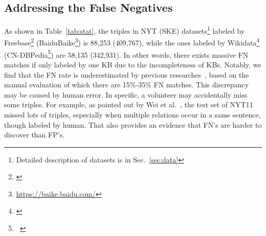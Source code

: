 \documentclass[11pt,a4paper]{article}
\begin{document}
\subsection{Addressing the False Negatives}
\label{sec:fn}
As shown in Table~\ref{tab:stat}, the triples in NYT (SKE) datasets\footnote{Detailed description of datasets is in Sec.~\ref{sec:data}} labeled by Freebase\footnote{\cite{bollacker2008freebase}}
(BaiduBaike\footnote{\url{https://baike.baidu.com/}}) is 88,253 (409,767), 
while the ones labeled by Wikidata\footnote{\cite{Vrandecic2014WikidataAF}} (CN-DBPedia\footnote{~\cite{Xu2017CNDBpediaAN}}) are 58,135 (342,931). 
In other words, there exists massive FN matches if only labeled by one KB due to the incompleteness of KBs. 
Notably, we find that the FN rate is underestimated by previous researches~\cite{min2013distant,xu2013filling}, based on the manual evaluation of which there are 15\%-35\% FN matches.
This discrepancy may be caused by human error.
In specific, a volunteer may accidentally miss some triples.
For example, as pointed out by Wei et al.~, the test set of NYT11~\cite{Hoffmann2011KnowledgeBasedWS} missed lots of triples, especially when multiple relations occur in a same sentence, though labeled by human.
That also provides an evidence that FN's are harder to discover than FP's.
\end{document}
